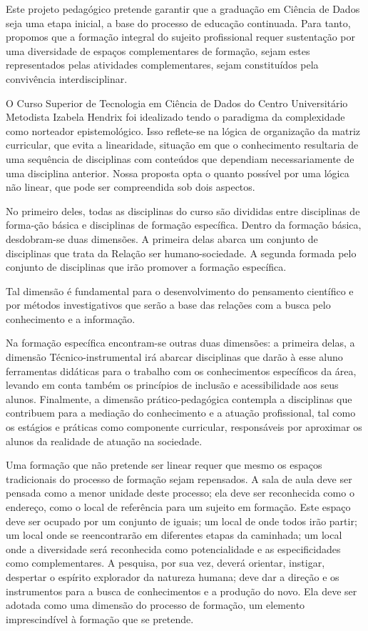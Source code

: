 \documentclass[a4paper, 12pt, openright, oneside, german, french, english, brazil]{abntex2}
\begin{document}
Este projeto pedagógico pretende garantir que a graduação em Ciência de Dados seja uma etapa inicial, a base do processo de educação continuada. Para tanto, propomos que a formação integral do sujeito profissional requer sustentação por uma diversidade de espaços complementares de formação, sejam estes representados pelas atividades complementares, sejam constituídos pela convivência interdisciplinar.

O Curso Superior de Tecnologia em Ciência de Dados do Centro Universitário Metodista Izabela Hendrix foi idealizado tendo o paradigma da complexidade como norteador epistemológico. Isso reflete-se na lógica de organização da matriz curricular, que evita a linearidade, situação em que o conhecimento resultaria de uma sequência de disciplinas com conteúdos que dependiam necessariamente de uma disciplina anterior. Nossa proposta opta o quanto possível por uma lógica não linear, que pode ser compreendida sob dois aspectos.

No primeiro deles, todas as disciplinas do curso são divididas entre disciplinas de forma-ção básica e disciplinas de formação específica. Dentro da formação básica, desdobram-se duas dimensões. A primeira delas abarca um conjunto de disciplinas que trata da Relação ser humano-sociedade. A segunda formada pelo conjunto de disciplinas que irão promover a formação específica.

Tal dimensão é fundamental para o desenvolvimento do pensamento científico e por métodos investigativos que serão a base das relações com a busca pelo conhecimento e a informação.

Na formação específica encontram-se outras duas dimensões: a primeira delas, a dimensão Técnico-instrumental irá abarcar disciplinas que darão à esse aluno ferramentas didáticas para o trabalho com os conhecimentos específicos da área, levando em conta também os princípios de inclusão e acessibilidade aos seus alunos. Finalmente, a dimensão prático-pedagógica contempla a disciplinas que contribuem para a mediação do conhecimento e a atuação profissional, tal como os estágios e práticas como componente curricular, responsáveis por aproximar os alunos da realidade de atuação na sociedade.

Uma formação que não pretende ser linear requer que mesmo os espaços tradicionais do processo de formação sejam repensados. A sala de aula deve ser pensada como a menor unidade deste processo; ela deve ser reconhecida como o endereço, como o local de referência para um sujeito em formação. Este espaço deve ser ocupado por um conjunto de iguais; um local de onde todos irão partir; um local onde se reencontrarão em diferentes etapas da caminhada; um local onde a diversidade será reconhecida como potencialidade e as especificidades como complementares. A pesquisa, por sua vez, deverá orientar, instigar, despertar o espírito explorador da natureza humana; deve dar a direção e os instrumentos para a busca de conhecimentos e a produção do novo. Ela deve ser adotada como uma dimensão do processo de formação, um elemento imprescindível à formação que se pretende.
\end{document}
